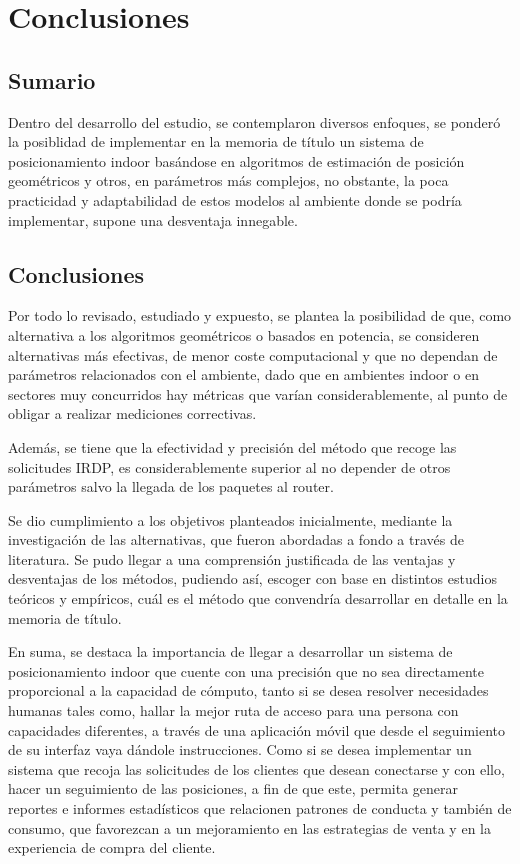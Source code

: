 \chapter{Conclusiones}

\section{Sumario}
Dentro del desarrollo del estudio, se contemplaron diversos enfoques, se ponderó la posiblidad de implementar en la memoria de título un sistema de posicionamiento indoor basándose en algoritmos de estimación de posición geométricos y otros, en parámetros más complejos, no obstante, la poca practicidad y adaptabilidad de estos modelos al ambiente donde se podría implementar, supone una desventaja innegable.

\section{Conclusiones}
Por todo lo revisado, estudiado y expuesto, se plantea la posibilidad de que, como alternativa a los algoritmos geométricos o basados en potencia, se consideren alternativas más efectivas, de menor coste computacional y que no dependan de parámetros relacionados con el ambiente, dado que en ambientes indoor o en sectores muy concurridos hay métricas que varían considerablemente, al punto de obligar a realizar mediciones correctivas.

Además, se tiene que la efectividad y precisión del método que recoge las solicitudes IRDP, es considerablemente superior al no depender de otros parámetros salvo la llegada de los paquetes al router.

Se dio cumplimiento a los objetivos planteados inicialmente, mediante la investigación de las alternativas, que fueron abordadas a fondo a través de literatura. Se pudo llegar a una comprensión justificada de las ventajas y desventajas de los métodos, pudiendo así, escoger con base en distintos estudios teóricos y empíricos, cuál es el método que convendría desarrollar en detalle en la memoria de título.

En suma, se destaca la importancia de llegar a desarrollar un sistema de posicionamiento indoor que cuente con una precisión que no sea directamente proporcional a la capacidad de cómputo, tanto si se desea resolver necesidades humanas tales como, hallar la mejor ruta de acceso para una persona con capacidades diferentes, a través de una aplicación móvil que desde el seguimiento de su interfaz vaya dándole instrucciones. Como si se desea implementar un sistema que recoja las solicitudes de los clientes que desean conectarse y con ello, hacer un seguimiento de las posiciones, a fin de que este, permita generar reportes e informes estadísticos que relacionen patrones de conducta y también de consumo, que favorezcan a un mejoramiento en las estrategias de venta y en la experiencia de compra del cliente.

